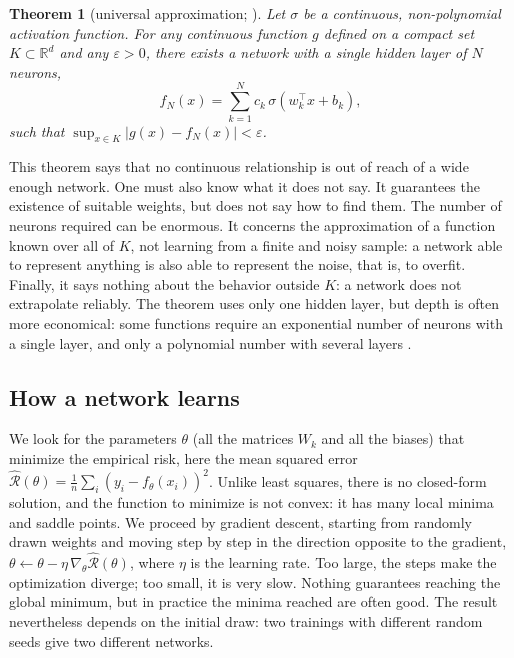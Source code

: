\documentclass[11pt,a4paper]{article}
\newtheorem*{theorem}{Theorem}
\begin{document}
\begin{theorem}[universal approximation; \citealp{cybenko1989, hornik1991, leshno1993}]
Let $\sigma$ be a continuous, non-polynomial activation function. For any continuous function $g$ defined on a compact
set $K \subset \mathbb{R}^d$ and any $\varepsilon > 0$, there exists a network with a single hidden layer of $N$
neurons,
\[
f_N(x) = \sum_{k=1}^{N} c_k\,\sigma(w_k^\top x + b_k),
\]
such that $\sup_{x \in K} \lvert g(x) - f_N(x) \rvert < \varepsilon$.
\end{theorem}

This theorem says that no continuous relationship is out of reach of a wide enough network. One must also know what it
does not say. It guarantees the existence of suitable weights, but does not say how to find them. The number of neurons
required can be enormous. It concerns the approximation of a function known over all of $K$, not learning from a
finite and noisy sample: a network able to represent anything is also able to represent the noise, that is, to
overfit. Finally, it says nothing about the behavior outside $K$: a network does not extrapolate reliably. The theorem
uses only one hidden layer, but depth is often more economical: some functions require an exponential number of
neurons with a single layer, and only a polynomial number with several layers \citep{telgarsky2016}.

\subsection{How a network learns}\label{sec:backprop}

We look for the parameters $\theta$ (all the matrices $W_k$ and all the biases) that minimize the empirical risk, here
the mean squared error $\hat{\mathcal R}(\theta) = \frac1n\sum_i (y_i - f_\theta(x_i))^2$. Unlike least squares, there is
no closed-form solution, and the function to minimize is not convex: it has many local minima and saddle points. We
proceed by gradient descent, starting from randomly drawn weights and moving step by step in the direction opposite to
the gradient, $\theta \leftarrow \theta - \eta\,\nabla_\theta \hat{\mathcal R}(\theta)$, where $\eta$ is the learning
rate. Too large, the steps make the optimization diverge; too small, it is very slow. Nothing guarantees reaching the
global minimum, but in practice the minima reached are often good. The result nevertheless depends on the initial
draw: two trainings with different random seeds give two different networks.
\end{document}
